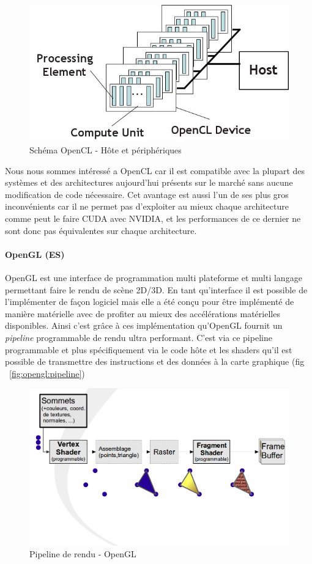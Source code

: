 \begin{figure}[H]
\centering
\includegraphics[width=0.5\linewidth]{images/opencl}
\caption{Schéma OpenCL - Hôte et périphériques\protect\footnotemark}
\label{fig:opencl}
\end{figure}


Nous nous sommes intéressé a OpenCL car il est compatible avec la plupart des systèmes et des architectures aujourd'hui présents sur le marché sans aucune modification de code nécessaire. Cet avantage est aussi l'un de ses plus gros inconvénients car il ne permet pas d'exploiter au mieux chaque architecture comme peut le faire CUDA avec NVIDIA, et les performances de ce dernier ne sont donc pas équivalentes sur chaque architecture. %

\paragraph{OpenGL (ES)} 
OpenGL est une interface de programmation multi plateforme et multi langage permettant faire le rendu de scène 2D/3D. En tant qu'interface il est possible de l'implémenter de façon logiciel mais elle a été conçu pour être implémenté de manière matérielle avec de profiter au mieux des accélérations matérielles disponibles. Ainsi c'est grâce à ces implémentation qu'OpenGL fournit un \emph{pipeline} programmable de rendu ultra performant. C'est via ce pipeline programmable et plus spécifiquement via le code hôte et les shaders qu'il est possible de transmettre des instructions et des données à la carte graphique (fig ~\ref{fig:opengl:pipeline})

\begin{figure}[H]
\centering
\includegraphics[width=\linewidth]{images/opengl-pipeline}
\caption{Pipeline de rendu - OpenGL\protect\footnotemark}
\end{figure}

